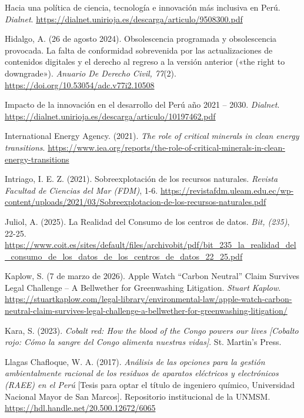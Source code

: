 \documentclass[stu,12pt,a4paper]{apa7}
\begin{document}
\begin{list}{}{
    \setlength{\leftmargin}{1.27cm}
    \setlength{\itemindent}{-1.27cm}  
    \setlength{\parsep}{0pt}       
    \setlength{\itemsep}{0.8em}      
}
\item Hacia una política de ciencia, tecnología e innovación más inclusiva en Perú. \textit{Dialnet}. \url{https://dialnet.unirioja.es/descarga/articulo/9508300.pdf}

\item Hidalgo, A. (26 de agosto 2024). Obsolescencia programada y obsolescencia provocada. La falta de conformidad sobrevenida por las actualizaciones de contenidos digitales y el derecho al regreso a la versión anterior («the right to downgrade»). \textit{Anuario De Derecho Civil, 77}(2). \url{https://doi.org/10.53054/adc.v77i2.10508}

\item Impacto de la innovación en el desarrollo del Perú año 2021 – 2030. \textit{Dialnet}. \url{https://dialnet.unirioja.es/descarga/articulo/10197462.pdf}

\item International Energy Agency. (2021). \textit{The role of critical minerals in clean energy transitions}. \url{https://www.iea.org/reports/the-role-of-critical-minerals-in-clean-energy-transitions}

\item Intriago, I. E. Z. (2021). Sobreexplotación de los recursos naturales. \textit{Revista Facultad de Ciencias del Mar (FDM)}, 1-6. \url{https://revistafdm.uleam.edu.ec/wp-content/uploads/2021/03/Sobreexplotacion-de-los-recursos-naturales.pdf}

\item Juliol, A. (2025). La Realidad del Consumo de los centros de datos. \textit{Bit, (235)}, 22-25. \url{https://www.coit.es/sites/default/files/archivobit/pdf/bit_235_la_realidad_del_consumo_de_los_datos_de_los_centros_de_datos_22_25.pdf}

\item Kaplow, S. (7 de marzo de 2026). Apple Watch “Carbon Neutral” Claim Survives Legal Challenge – A Bellwether for Greenwashing Litigation. \textit{Stuart Kaplow}. \url{https://stuartkaplow.com/legal-library/environmental-law/apple-watch-carbon-neutral-claim-survives-legal-challenge-a-bellwether-for-greenwashing-litigation/}

\item Kara, S. (2023). \textit{Cobalt red: How the blood of the Congo powers our lives [Cobalto rojo: Cómo la sangre del Congo alimenta nuestras vidas]}. St. Martin's Press.

\item Llagas Chafloque, W. A. (2017). \textit{Análisis de las opciones para la gestión ambientalmente racional de los residuos de aparatos eléctricos y electrónicos (RAEE) en el Perú} [Tesis para optar el título de ingeniero químico, Universidad Nacional Mayor de San Marcos]. Repositorio institucional de la UNMSM. \url{https://hdl.handle.net/20.500.12672/6065}


\end{list}
\end{document}
